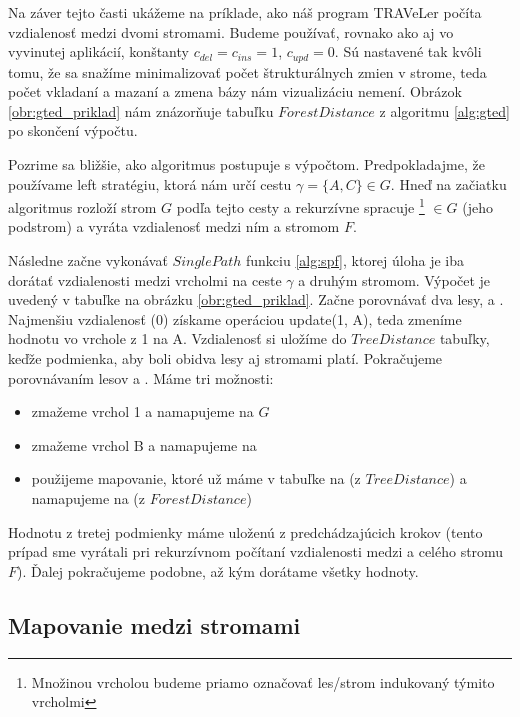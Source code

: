 Na záver tejto časti ukážeme na príklade, ako náš program TRAVeLer počíta vzdialenosť
medzi dvomi stromami. Budeme používať, rovnako ako aj vo vyvinutej aplikácií,
konštanty $c_{del} = c_{ins} = 1$, $c_{upd} = 0$. Sú nastavené tak
kvôli tomu, že sa snažíme minimalizovať počet štrukturálnych zmien v strome, teda
počet vkladaní a mazaní a zmena bázy nám vizualizáciu nemení.
Obrázok \ref{obr:gted_priklad} nám znázorňuje tabuľku $ForestDistance$ z algoritmu
\ref{alg:gted} po skončení výpočtu.

Pozrime sa bližšie, ako algoritmus postupuje s výpočtom. Predpokladajme, že
používame left stratégiu, ktorá nám určí cestu $\gamma = \{A, C\} \in G$.
Hneď na začiatku algoritmus rozloží strom $G$ podľa tejto cesty a rekurzívne
spracuje \footnote{Množinou vrcholou budeme priamo označovať les/strom
indukovaný týmito vrcholmi} $\in G$ (jeho podstrom) a vyráta vzdialenosť medzi ním a stromom $F$.



Následne začne vykonávať $SinglePath$ funkciu \ref{alg:spf}, ktorej úloha je iba dorátať
vzdialenosti medzi vrcholmi na ceste $\gamma$ a druhým stromom.
Výpočet je uvedený v tabuľke na obrázku \ref{obr:gted_priklad}.
Začne porovnávať dva lesy,  a . Najmenšiu vzdialenosť (0) získame operáciou
update(1, A), teda zmeníme hodnotu vo vrchole z 1 na A. Vzdialenosť si uložíme do $TreeDistance$
tabuľky, keďže podmienka, aby boli obidva lesy aj stromami platí.
Pokračujeme porovnávaním lesov  a .
Máme tri možnosti:
\begin{itemize}
  \item zmažeme vrchol 1 a namapujeme \set{} na $G$
  \item zmažeme vrchol B a namapujeme  na 
  \item použijeme mapovanie, ktoré už máme v tabuľke  na  (z $TreeDistance$)
    a namapujeme \set{} na  (z $ForestDistance$)
\end{itemize}
Hodnotu z tretej podmienky máme uloženú z predchádzajúcich krokov (tento prípad sme vyrátali
pri rekurzívnom počítaní vzdialenosti medzi  a celého stromu $F$).
Ďalej pokračujeme podobne, až kým dorátame všetky hodnoty.



\subsection{Mapovanie medzi stromami}

